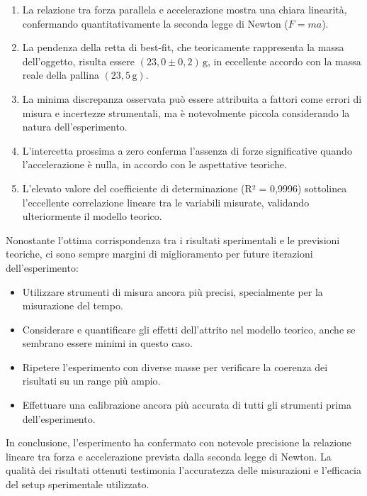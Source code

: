 \begin{enumerate}
    \item La relazione tra forza parallela e accelerazione mostra una chiara linearità, confermando quantitativamente la seconda legge di Newton ($F = ma$).
    
    \item La pendenza della retta di best-fit, che teoricamente rappresenta la massa dell'oggetto, risulta essere $(23,0 \pm 0,2) \, \text{g}$, in eccellente accordo con la massa reale della pallina $(23,5 \, \text{g})$.
    
    \item La minima discrepanza osservata può essere attribuita a fattori come errori di misura e incertezze strumentali, ma è notevolmente piccola considerando la natura dell'esperimento.
    
    \item L'intercetta prossima a zero conferma l'assenza di forze significative quando l'accelerazione è nulla, in accordo con le aspettative teoriche.
    
    \item L'elevato valore del coefficiente di determinazione (R² = 0,9996) sottolinea l'eccellente correlazione lineare tra le variabili misurate, validando ulteriormente il modello teorico.
\end{enumerate}

Nonostante l'ottima corrispondenza tra i risultati sperimentali e le previsioni teoriche, ci sono sempre margini di miglioramento per future iterazioni dell'esperimento:

\begin{itemize}
    \item Utilizzare strumenti di misura ancora più precisi, specialmente per la misurazione del tempo.
    \item Considerare e quantificare gli effetti dell'attrito nel modello teorico, anche se sembrano essere minimi in questo caso.
    \item Ripetere l'esperimento con diverse masse per verificare la coerenza dei risultati su un range più ampio.
    \item Effettuare una calibrazione ancora più accurata di tutti gli strumenti prima dell'esperimento.
\end{itemize}

In conclusione, l'esperimento ha confermato con notevole precisione la relazione lineare tra forza e accelerazione prevista dalla seconda legge di Newton. La qualità dei risultati ottenuti testimonia l'accuratezza delle misurazioni e l'efficacia del setup sperimentale utilizzato.


